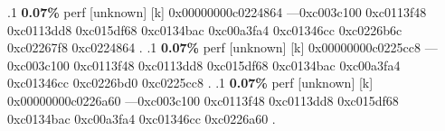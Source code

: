 \begin{profile}
{.1 \textbf{ 0.07\%} perf             [unknown]              [k] 0x00000000c0224864\newline {} ---0xc003c100\newline {} 0xc0113f48\newline {} 0xc0113dd8\newline {} 0xc015df68\newline {} 0xc0134bac\newline {} 0xc00a3fa4\newline {} 0xc01346cc\newline {} 0xc0226b6c\newline {} 0xc02267f8\newline {} 0xc0224864\newline {} . 
.1 \textbf{ 0.07\%} perf             [unknown]              [k] 0x00000000c0225cc8\newline {} ---0xc003c100\newline {} 0xc0113f48\newline {} 0xc0113dd8\newline {} 0xc015df68\newline {} 0xc0134bac\newline {} 0xc00a3fa4\newline {} 0xc01346cc\newline {} 0xc0226bd0\newline {} 0xc0225cc8\newline {} . 
.1 \textbf{ 0.07\%} perf             [unknown]              [k] 0x00000000c0226a60\newline {} ---0xc003c100\newline {} 0xc0113f48\newline {} 0xc0113dd8\newline {} 0xc015df68\newline {} 0xc0134bac\newline {} 0xc00a3fa4\newline {} 0xc01346cc\newline {} 0xc0226a60\newline {} . 
}
\end{profile}
